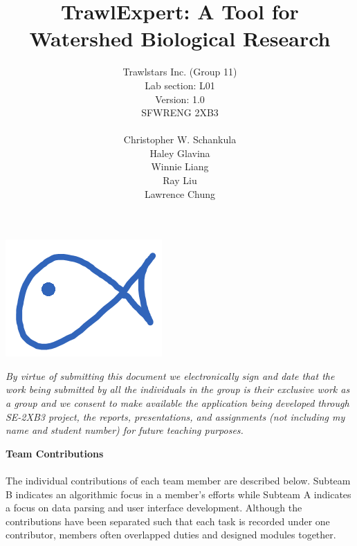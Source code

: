\documentclass{article}
\begin{document}
\title{\textbf{TrawlExpert: A Tool for Watershed Biological Research}}
\author{Trawlstars Inc. (Group 11) \\ Lab section: L01  \\ Version: 1.0 \\ SFWRENG 2XB3 \\ \\ Christopher W. Schankula \\ Haley Glavina \\ Winnie Liang \\ Ray Liu \\ Lawrence Chung\\}


\maketitle

\begin{center}
\includegraphics{logo.png}
\end{center}

\newpage

\begin{versionhistory}
\end{versionhistory} 

\noindent\textit{By virtue of submitting this document we electronically sign and date that the work being submitted by all the individuals in the group is their exclusive work as a group and we consent to make available the application being developed through SE-2XB3 project, the reports, presentations, and assignments (not including my name and student number) for future teaching purposes.}

\newpage

\textbf{\Large{Team Contributions}}\\ \\
The individual contributions of each team member are described below. Subteam B indicates an algorithmic focus in a member's efforts while Subteam A indicates a focus on data parsing and user interface development. Although the contributions have been separated such that each task is recorded under one contributor, members often overlapped duties and designed modules together. \\
\end{document}
